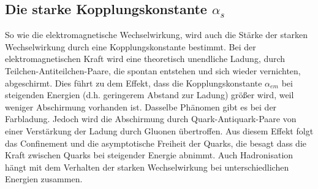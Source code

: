 
\subsection{Die starke Kopplungskonstante $\alpha_s$}\label{sec:alpha}
So wie die elektromagnetische Wechselwirkung, wird auch die Stärke der starken Wechselwirkung durch eine Kopplungskonstante bestimmt. Bei der elektromagnetischen Kraft wird eine theoretisch unendliche Ladung, durch Teilchen-Antiteilchen-Paare, die spontan entstehen und sich wieder vernichten, abgeschirmt. Dies führt zu dem Effekt, dass die Kopplungskonstante $\alpha_{em}$ bei steigenden Energien (d.h. geringerem Abstand zur Ladung) größer wird, weil weniger Abschirmung vorhanden ist\cite{halzen2008quark}. Dasselbe Phänomen gibt es bei der Farbladung. Jedoch wird die Abschirmung durch Quark-Antiquark-Paare von einer Verstärkung der Ladung durch Gluonen übertroffen. Aus diesem Effekt folgt das Confinement und die asymptotische Freiheit der Quarks, die besagt dass die Kraft zwischen Quarks bei steigender Energie abnimmt. Auch Hadronisation hängt mit dem Verhalten der starken Wechselwirkung bei unterschiedlichen Energien zusammen.

